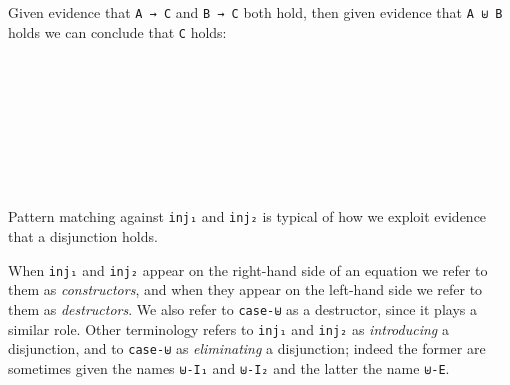 Given evidence that \texttt{A\ →\ C} and \texttt{B\ →\ C} both hold,
then given evidence that \texttt{A\ ⊎\ B} holds we can conclude that
\texttt{C} holds:

\begin{fence}
\begin{code}%
\>[0]\AgdaSpace{}%
\AgdaSymbol{:}\AgdaSpace{}%
\AgdaSpace{}%
\AgdaSymbol{\{}\AgdaSpace{}%
\AgdaSpace{}%
\AgdaSpace{}%
\AgdaSymbol{:}\AgdaSpace{}%
\AgdaSymbol{\}}\<%
\\
\>[0][@{}l@{\AgdaIndent{0}}]%
\>[2]\AgdaSpace{}%
\AgdaSymbol{(}\AgdaSpace{}%
\AgdaSpace{}%
\AgdaSymbol{)}\<%
\\
%
\>[2]\AgdaSpace{}%
\AgdaSymbol{(}\AgdaSpace{}%
\AgdaSpace{}%
\AgdaSymbol{)}\<%
\\
%
\>[2]%
\>[488I]\AgdaSpace{}%
\AgdaSpace{}%
\<%
\\
\>[.][@{}l@{}]\<[488I]%
\>[4]\AgdaComment{-----------}\<%
\\
%
\>[2]\AgdaSpace{}%
\<%
\\
\>[0]\AgdaSpace{}%
\AgdaSpace{}%
\AgdaSpace{}%
\AgdaSymbol{(}\AgdaSpace{}%
\AgdaSymbol{)}\AgdaSpace{}%
\AgdaSymbol{=}\AgdaSpace{}%
\AgdaSpace{}%
\<%
\\
\>[0]\AgdaSpace{}%
\AgdaSpace{}%
\AgdaSpace{}%
\AgdaSymbol{(}\AgdaSpace{}%
\AgdaSymbol{)}\AgdaSpace{}%
\AgdaSymbol{=}\AgdaSpace{}%
\AgdaSpace{}%
\<%
\end{code}
\end{fence}

Pattern matching against \texttt{inj₁} and \texttt{inj₂} is typical of
how we exploit evidence that a disjunction holds.

When \texttt{inj₁} and \texttt{inj₂} appear on the right-hand side of an
equation we refer to them as \emph{constructors}, and when they appear
on the left-hand side we refer to them as \emph{destructors}. We also
refer to \texttt{case-⊎} as a destructor, since it plays a similar role.
Other terminology refers to \texttt{inj₁} and \texttt{inj₂} as
\emph{introducing} a disjunction, and to \texttt{case-⊎} as
\emph{eliminating} a disjunction; indeed the former are sometimes given
the names \texttt{⊎-I₁} and \texttt{⊎-I₂} and the latter the name
\texttt{⊎-E}.


